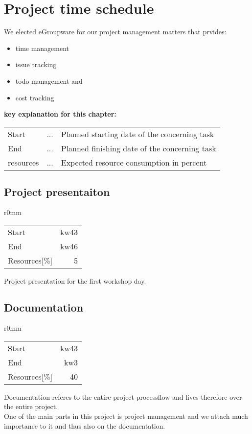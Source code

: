 \section{Project time schedule}

We elected eGroupware for our project management matters that prvides:
\begin{itemize}
 \item time management
 \item issue tracking
 \item todo management and
 \item cost tracking
\end{itemize}

\textbf{key explanation for this chapter:} \\
\begin{tabular}{lcl}
Start & ... & Planned starting date of the concerning task\\
End   & ... & Planned finishing date of the concerning task\\ 
resources & ... & Expected resource consumption in percent\\
\end{tabular}


\subsection{Project presentaiton}
\begin{wrapfigure}{r}{0mm}
\begin{tabular}[t]{|lr|}
\hline
Start & kw43\\
End & kw46\\
Resources[\%] & 5\\
\hline
\end{tabular}
\end{wrapfigure}
Project presentation for the first workshop day.\\

\subsection{Documentation}
\begin{wrapfigure}{r}{0mm}
\begin{tabular}[t]{|lr|}
\hline
Start & kw43\\
End & kw3\\
Resources[\%] & 40\\
\hline
\end{tabular}
\end{wrapfigure}
Documentation referes to the entire project processflow and lives therefore over the entire project.\\
One of the main parts in this project is project management and we attach much 
importance to it and thus also on the documentation.\\

